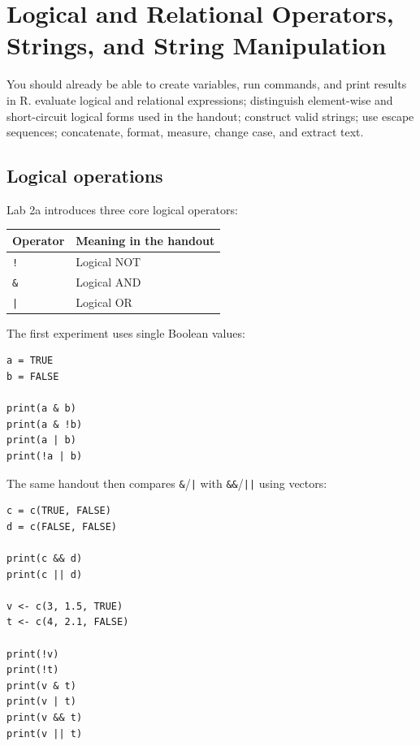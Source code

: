 \chapter{Logical and Relational Operators, Strings, and String Manipulation}
\label{chap:logic-strings}

\chapterguide
  {You should already be able to create variables, run commands, and print results in R.}
  {evaluate logical and relational expressions; distinguish element-wise and short-circuit logical forms used in the handout; construct valid strings; use escape sequences; concatenate, format, measure, change case, and extract text.}

\section{Logical operations}

Lab 2a introduces three core logical operators:

\begin{dstable}
\begin{tabularx}{\linewidth}{@{}p{2.2cm}X@{}}
\toprule
\rowcolor{DSPaleBlue!92}
Operator & Meaning in the handout \\
\midrule
\texttt{!} & Logical NOT \\
\texttt{\&} & Logical AND \\
\texttt{|} & Logical OR \\
\bottomrule
\end{tabularx}
\end{dstable}

The first experiment uses single Boolean values:

\begin{lstlisting}[style=dsr]
a = TRUE
b = FALSE

print(a & b)
print(a & !b)
print(a | b)
print(!a | b)
\end{lstlisting}

The same handout then compares \texttt{\&}/\texttt{|} with \texttt{\&\&}/\texttt{||} using vectors:

\begin{lstlisting}[style=dsr]
c = c(TRUE, FALSE)
d = c(FALSE, FALSE)

print(c && d)
print(c || d)

v <- c(3, 1.5, TRUE)
t <- c(4, 2.1, FALSE)

print(!v)
print(!t)
print(v & t)
print(v | t)
print(v && t)
print(v || t)
\end{lstlisting}

